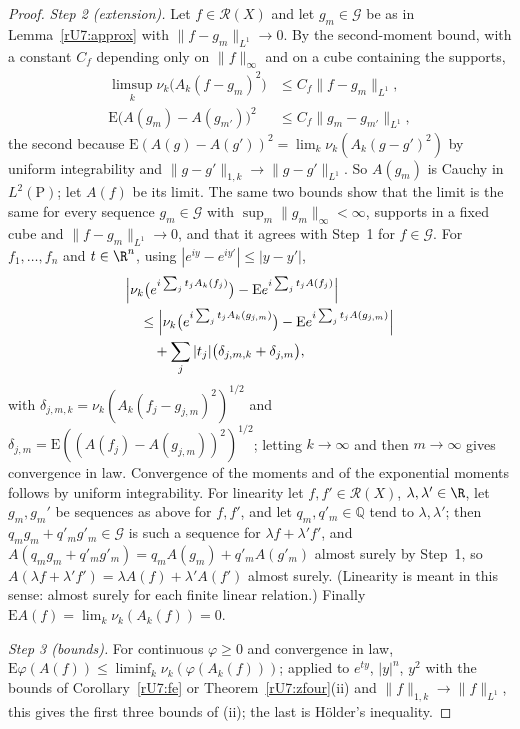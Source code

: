 \begin{proof}
\emph{Step 2 (extension).} Let $f\in\mathcal R(X)$ and let $g_m\in\mathcal G$ be
as in Lemma~\ref{rU7:approx} with $\|f-g_m\|_{L^1}\to0$. By the second-moment
bound, with a constant $C_f$ depending only on $\|f\|_\infty$ and on a cube
containing the supports,
\begin{align*}
\limsup_k\nu_k\bigl(A_k(f-g_m)^2\bigr)&\le C_f\|f-g_m\|_{L^1},\\
\mathrm E\bigl(A(g_m)-A(g_{m'})\bigr)^2&\le C_f\|g_m-g_{m'}\|_{L^1},
\end{align*}
the second because $\mathrm E(A(g)-A(g'))^2=\lim_k\nu_k(A_k(g-g')^2)$ by
uniform integrability and $\|g-g'\|_{1,k}\to\|g-g'\|_{L^1}$. So $A(g_m)$ is
Cauchy in $L^2(\mathrm P)$; let $A(f)$ be its limit. The same two bounds
show that the limit is the same for every sequence $g_m\in\mathcal G$ with
$\sup_m\|g_m\|_\infty<\infty$, supports in a fixed cube and $\|f-g_m\|_{L^1}
\to0$, and that it agrees with Step~1 for $f\in\mathcal G$. For $f_1,\dots,f_n$ and $t\in\R^n$, using $|e^{iy}-e^{iy'}|\le
|y-y'|$,
\begin{align*}
&\Bigl|\nu_k\bigl(e^{i\sum_jt_jA_k(f_j)}\bigr)-\mathrm Ee^{i\sum_jt_jA(f_j)}
\Bigr|\\
&\quad\le\Bigl|\nu_k\bigl(e^{i\sum_jt_jA_k(g_{j,m})}\bigr)-\mathrm Ee^{i\sum
_jt_jA(g_{j,m})}\Bigr|\\
&\qquad+\sum_j|t_j|\bigl(\delta_{j,m,k}+\delta_{j,m}\bigr),
\end{align*}
with $\delta_{j,m,k}=\nu_k(A_k(f_j-g_{j,m})^2)^{1/2}$ and $\delta_{j,m}=
\mathrm E((A(f_j)-A(g_{j,m}))^2)^{1/2}$; letting $k\to\infty$ and then
$m\to\infty$ gives convergence in law. Convergence of the moments and of the
exponential moments follows by uniform integrability. For linearity let
$f,f'\in\mathcal R(X)$, $\lambda,\lambda'\in\R$, let $g_m,g_m'$ be sequences
as above for $f,f'$, and let $q_m,q'_m\in\mathbb Q$ tend to $\lambda,
\lambda'$; then $q_mg_m+q'_mg'_m\in\mathcal G$ is such a sequence for
$\lambda f+\lambda'f'$, and $A(q_mg_m+q'_mg'_m)=q_mA(g_m)+q'_mA(g'_m)$ almost
surely by Step~1, so $A(\lambda f+\lambda'f')=\lambda A(f)+\lambda'A(f')$
almost surely. (Linearity is meant in this sense: almost surely for each
finite linear relation.) Finally $\mathrm EA(f)=\lim_k\nu_k(A_k(f))=0$.

\emph{Step 3 (bounds).} For continuous $\varphi\ge0$ and convergence in law,
$\mathrm E\varphi(A(f))\le\liminf_k\nu_k(\varphi(A_k(f)))$; applied to
$e^{ty}$, $|y|^n$, $y^2$ with the bounds of Corollary~\ref{rU7:fe} or
Theorem~\ref{rU7:zfour}(ii) and $\|f\|_{1,k}\to\|f\|_{L^1}$, this gives the first
three bounds of (ii); the last is H\"older's inequality.


\end{proof}
